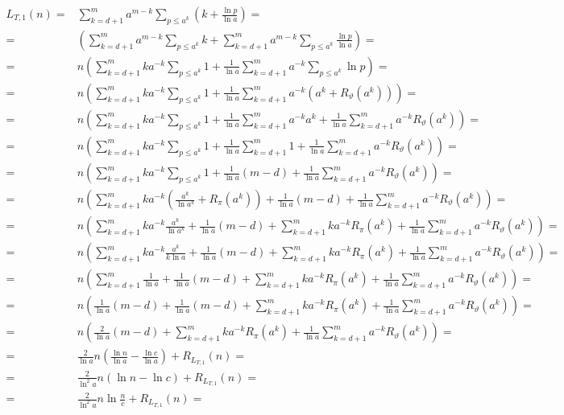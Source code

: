 \documentclass{article}
\begin{document}
\begin{align*}
L_{T,1}(n) =& \sum_{k=d+1}^{m} a^{m-k} \sum_{p \le a^k} \left( k + \frac{\ln{p}}{\ln{a}} \right) = \\
=& \left( \sum_{k=d+1}^{m} a^{m-k} \sum_{p \le a^k} k + \sum_{k=d+1}^{m} a^{m-k} \sum_{p \le a^k} \frac{\ln{p}}{\ln{a}} \right) = \\
=& n \left( \sum_{k=d+1}^{m} k a^{-k} \sum_{p \le a^k} 1 + \frac{1}{\ln{a}} \sum_{k=d+1}^{m} a^{-k} \sum_{p \le a^k} \ln{p} \right) = \\
=& n \left( \sum_{k=d+1}^{m} k a^{-k} \sum_{p \le a^k} 1 + \frac{1}{\ln{a}} \sum_{k=d+1}^{m} a^{-k} \left( a^k + R_{\vartheta}(a^k) \right) \right) = \\
=& n \left( \sum_{k=d+1}^{m} k a^{-k} \sum_{p \le a^k} 1 + \frac{1}{\ln{a}} \sum_{k=d+1}^{m} a^{-k} a^k + \frac{1}{\ln{a}} \sum_{k=d+1}^{m} a^{-k} R_{\vartheta}(a^k) \right) = \\
=& n \left( \sum_{k=d+1}^{m} k a^{-k} \sum_{p \le a^k} 1 + \frac{1}{\ln{a}} \sum_{k=d+1}^{m} 1 + \frac{1}{\ln{a}} \sum_{k=d+1}^{m} a^{-k} R_{\vartheta}(a^k) \right) = \\
=& n \left( \sum_{k=d+1}^{m} k a^{-k} \sum_{p \le a^k} 1 + \frac{1}{\ln{a}} \left( m - d \right) + \frac{1}{\ln{a}} \sum_{k=d+1}^{m} a^{-k} R_{\vartheta}(a^k) \right) = \\
=& n \left( \sum_{k=d+1}^{m} k a^{-k} \left( \frac{a^k}{\ln{a^k}} + R_{\pi}(a^k) \right) + \frac{1}{\ln{a}} \left( m - d \right) + \frac{1}{\ln{a}} \sum_{k=d+1}^{m} a^{-k} R_{\vartheta}(a^k) \right) = \\
=& n \left( \sum_{k=d+1}^{m} k a^{-k} \frac{a^k}{\ln{a^k}} + \frac{1}{\ln{a}} \left( m - d \right) + \sum_{k=d+1}^{m} k a^{-k} R_{\pi}(a^k) + \frac{1}{\ln{a}} \sum_{k=d+1}^{m} a^{-k} R_{\vartheta}(a^k) \right) = \\
=& n \left( \sum_{k=d+1}^{m} k a^{-k} \frac{a^k}{k \ln{a}} + \frac{1}{\ln{a}} \left( m - d \right) + \sum_{k=d+1}^{m} k a^{-k} R_{\pi}(a^k) + \frac{1}{\ln{a}} \sum_{k=d+1}^{m} a^{-k} R_{\vartheta}(a^k) \right) = \\
=& n \left( \sum_{k=d+1}^{m} \frac{1}{\ln{a}} + \frac{1}{\ln{a}} \left( m - d \right) + \sum_{k=d+1}^{m} k a^{-k} R_{\pi}(a^k) + \frac{1}{\ln{a}} \sum_{k=d+1}^{m} a^{-k} R_{\vartheta}(a^k) \right) = \\
=& n \left( \frac{1}{\ln{a}} \left( m - d \right) + \frac{1}{\ln{a}} \left( m - d \right) + \sum_{k=d+1}^{m} k a^{-k} R_{\pi}(a^k) + \frac{1}{\ln{a}} \sum_{k=d+1}^{m} a^{-k} R_{\vartheta}(a^k) \right) = \\
=& n \left( \frac{2}{\ln{a}} \left( m - d \right) + \sum_{k=d+1}^{m} k a^{-k} R_{\pi}(a^k) + \frac{1}{\ln{a}} \sum_{k=d+1}^{m} a^{-k} R_{\vartheta}(a^k) \right) = \\
=& \frac{2}{\ln{a}} n \left( \frac{\ln{n}}{\ln{a}} - \frac{\ln{c}}{\ln{a}} \right) + R_{L_{T,1}}(n) = \\
=& \frac{2}{\ln^2{a}} n \left(\ln{n} - \ln{c} \right) + R_{L_{T,1}}(n) = \\
=& \frac{2}{\ln^2{a}} n \ln{\frac{n}{c}} + R_{L_{T,1}}(n) = \\
\end{align*}
\end{document}
